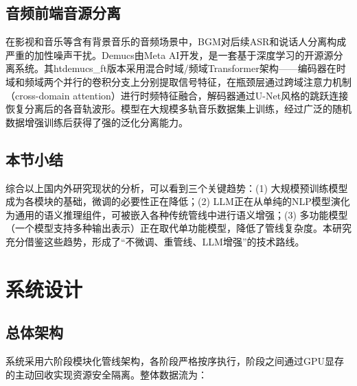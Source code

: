 \documentclass[12pt, a4paper]{article}
\begin{document}
\subsection{音频前端音源分离}

在影视和音乐等含有背景音乐的音频场景中，BGM对后续ASR和说话人分离构成严重的加性噪声干扰。Demucs\cite{defossez2021demucs,rouard2023demucs}由Meta AI开发，是一套基于深度学习的开源源分离系统。其htdemucs\_ft版本采用混合时域/频域Transformer架构——编码器在时域和频域两个并行的卷积分支上分别提取信号特征，在瓶颈层通过跨域注意力机制（cross-domain attention）进行时频特征融合，解码器通过U-Net风格的跳跃连接恢复分离后的各音轨波形。模型在大规模多轨音乐数据集上训练，经过广泛的随机数据增强训练后获得了强的泛化分离能力。

\subsection{本节小结}

综合以上国内外研究现状的分析，可以看到三个关键趋势：(1) 大规模预训练模型成为各模块的基础，微调的必要性正在降低；(2) LLM正在从单纯的NLP模型演化为通用的语义推理组件，可被嵌入各种传统管线中进行语义增强；(3) 多功能模型（一个模型支持多种输出表示）正在取代单功能模型，降低了管线复杂度。本研究充分借鉴这些趋势，形成了``不微调、重管线、LLM增强''的技术路线。

\section{系统设计}

\subsection{总体架构}

系统采用六阶段模块化管线架构，各阶段严格按序执行，阶段之间通过GPU显存的主动回收实现资源安全隔离。整体数据流为：
\end{document}
